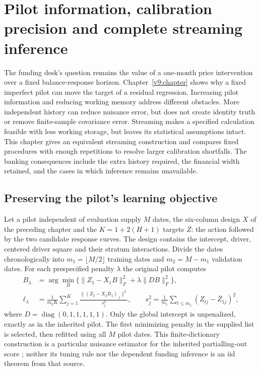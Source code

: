 \chapter{Pilot information, calibration precision and complete streaming inference}
\label{ch:precision-streaming}

The funding desk's question remains the value of a one-month price intervention
over a fixed balance-response horizon. Chapter~\ref{v9:chapter} shows why a
fixed imperfect pilot can move the target of a residual regression. Increasing
pilot information and reducing working memory address different obstacles.
More independent history can reduce nuisance error, but does not create identity
truth or remove finite-sample covariance error. Streaming makes a specified
calculation feasible with less working storage, but leaves its statistical
assumptions intact. This chapter gives an equivalent streaming construction and
compares fixed procedures with enough repetitions to resolve larger calibration
shortfalls. The banking consequences include the extra history required, the
financial width retained, and the cases in which inference remains unavailable.

\section{Preserving the pilot's learning objective}
\label{v10:pilot}

Let a pilot independent of evaluation supply $M$ dates, the six-column design
$X$ of the preceding chapter and the $K=1+2(H+1)$ targets $Z$: the action
followed by the two candidate response curves. The design contains the intercept, driver,
centered driver square and their stratum interactions. Divide the dates
chronologically into $m_1=\lfloor M/2\rfloor$ training dates and $m_2=M-m_1$
validation dates. For each prespecified penalty $\lambda$ the original pilot
computes
\begin{align}
 B_\lambda&=\arg\min_B\{\|Z_1-X_1B\|_F^2+
                              \lambda\|DB\|_F^2\},\\
 \ell_\lambda&=\frac{1}{m_2K}\sum_{j=1}^K
                 \frac{\|(Z_2-X_2B_\lambda)_{\cdot j}\|^2}{s_j^2},
 \qquad s_j^2=\frac1{m_1}\sum_{t\leq m_1}(Z_{tj}-\bar Z_{1j})^2,
\end{align}
where $D=\operatorname{diag}(0,1,1,1,1,1)$. Only the global intercept is
unpenalized, exactly as in the inherited pilot. The first minimizing penalty
in the supplied list is selected, then refitted using all $M$ pilot dates.
This finite-dictionary construction is a particular nuisance estimator for the
inherited partialling-out score \citep{dml2018}; neither its tuning rule nor
the dependent funding inference is an iid theorem from that source.

